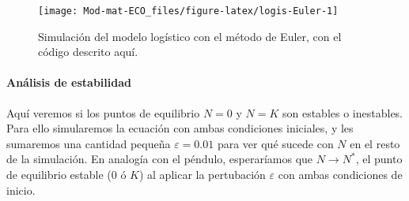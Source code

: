 \documentclass[
]{book}
\begin{document}
\begin{figure}

{\centering \texttt{[image: Mod-mat-ECO\_files/figure-latex/logis-Euler-1]} 

}

\caption{Simulación del modelo logístico con el método de Euler, con el código descrito aquí.}\label{fig:logis-Euler}
\end{figure}

\hypertarget{anuxe1lisis-de-estabilidad-2}{%
\paragraph{Análisis de estabilidad}\label{anuxe1lisis-de-estabilidad-2}}

Aquí veremos si los puntos de equilibrio \(N=0\) y \(N=K\) son estables o inestables. Para ello simularemos la ecuación con ambas condiciones iniciales, y les sumaremos una cantidad pequeña \(\varepsilon = 0.01\) para ver qué sucede con \(N\) en el resto de la simulación. En analogía con el péndulo, esperaríamos que \(N \rightarrow N^*\), el punto de equilibrio estable (\(0\) ó \(K\)) al aplicar la pertubación \(\varepsilon\) con ambas condiciones de inicio.
\end{document}
